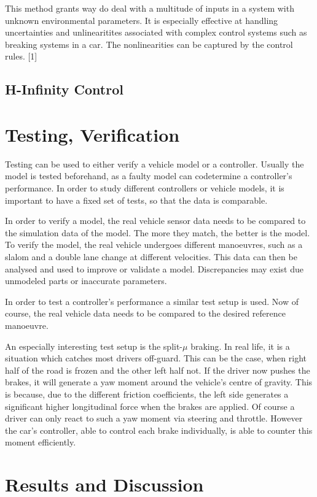 \documentclass[conference]{IEEEtran}
\begin{document}
This method grants way do deal with a multitude of inputs in a system with unknown environmental parameters. It is especially effective at handling uncertainties and unlinearitites associated with complex control systems such as breaking systems in a car. The nonlinearities can be captured by the control rules.
[1]
\subsection{H-Infinity Control}

\section{Testing, Verification}

Testing can be used to either verify a vehicle model or a controller. Usually the model is tested beforehand, as a faulty model can codetermine a controller's performance. 
In order to study different controllers or vehicle models, it is important to have a fixed set of tests, so that the data is comparable.

In order to verify a model, the real vehicle sensor data needs to be compared to the simulation data of the model. The more they match, the better is the model. To verify the model, the real vehicle undergoes different manoeuvres, such as a slalom and a double lane change at different velocities. This data can then be analysed and used to improve or validate a model. Discrepancies may exist due unmodeled parts or inaccurate parameters.

In order to test a controller's performance a similar test setup is used. Now of course, the real vehicle data needs to be compared to the desired reference manoeuvre.

An especially interesting test setup is the split-$\mu$ braking. In real life, it is a situation which catches most drivers off-guard. This can be the case, when right half of the road is frozen and the other left half not. If the driver now pushes the brakes, it will generate a yaw moment around the vehicle's centre of gravity. This is because, due to the different friction coefficients, the left side generates a significant higher longitudinal force when the brakes are applied. Of course a driver can only react to such a yaw moment via steering and throttle. However the car's controller, able to control each brake individually, is able to counter this moment efficiently.


\section{Results and Discussion}
\end{document}
